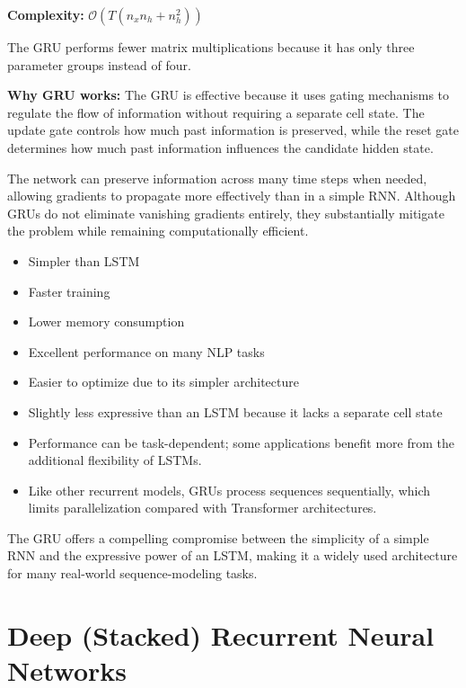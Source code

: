 \textbf{Complexity:} $\mathcal{O}(T(n_x n_h + n_h^2))$

The GRU performs fewer matrix multiplications because it has only three parameter groups instead of four.

\textbf{Why GRU works:}
The GRU is effective because it uses gating mechanisms to regulate the flow of information without requiring a separate cell state. The update gate controls how much past information is preserved, while the reset gate determines how much past information influences the candidate hidden state.

The network can preserve information across many time steps when needed, allowing gradients to propagate more effectively than in a simple RNN. Although GRUs do not eliminate vanishing gradients entirely, they substantially mitigate the problem while remaining computationally efficient.

\begin{advbox}[Advantages]
\begin{itemize}
    \item Simpler than LSTM
    \item Faster training
    \item Lower memory consumption
    \item Excellent performance on many NLP tasks
    \item Easier to optimize due to its simpler architecture
\end{itemize}
\end{advbox}

\begin{advbox}[Limitations]
\begin{itemize}
    \item Slightly less expressive than an LSTM because it lacks a separate cell state
    \item Performance can be task-dependent; some applications benefit more from the additional flexibility of LSTMs.
    \item Like other recurrent models, GRUs process sequences sequentially, which limits parallelization compared with Transformer architectures.
\end{itemize}
\end{advbox}

The GRU offers a compelling compromise between the simplicity of a simple RNN and the expressive power of an LSTM, making it a widely used architecture for many real-world sequence-modeling tasks.

\section{Deep (Stacked) Recurrent Neural Networks}

